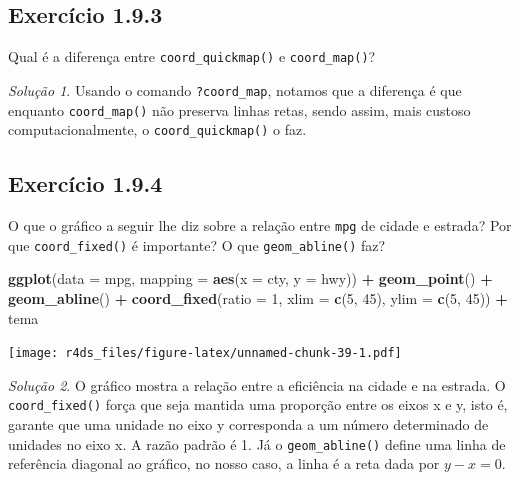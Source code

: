 \documentclass[
]{latex/krantz}
\newenvironment{Shaded}{\begin{snugshade}}{\end{snugshade}}
\newcommand{\AttributeTok}[1]{\textcolor[rgb]{0.13,0.29,0.53}{#1}}
\newcommand{\DecValTok}[1]{\textcolor[rgb]{0.00,0.00,0.81}{#1}}
\newcommand{\FunctionTok}[1]{\textcolor[rgb]{0.13,0.29,0.53}{\textbf{#1}}}
\newcommand{\NormalTok}[1]{#1}
\newcommand{\SpecialCharTok}[1]{\textcolor[rgb]{0.81,0.36,0.00}{\textbf{#1}}}
\theoremstyle{definition}
\theoremstyle{definition}
\theoremstyle{definition}
\theoremstyle{definition}
\theoremstyle{remark}
\newtheorem*{solution}{Solução}
\begin{document}
\hypertarget{exr1-9-3}{%
\subsection*{Exercício 1.9.3}\label{exr1-9-3}}

Qual é a diferença entre \texttt{coord\_quickmap()} e \texttt{coord\_map()}?

\begin{solution}
Usando o comando \texttt{?coord\_map}, notamos que a diferença é que enquanto \texttt{coord\_map()} não preserva linhas retas, sendo assim, mais custoso computacionalmente, o \texttt{coord\_quickmap()} o faz.
\end{solution}

\hypertarget{exr1-9-4}{%
\subsection*{Exercício 1.9.4}\label{exr1-9-4}}

O que o gráfico a seguir lhe diz sobre a relação entre \texttt{mpg} de cidade e estrada? Por que \texttt{coord\_fixed()} é importante? O que \texttt{geom\_abline()} faz?

\begin{Shaded}
\begin{Highlighting}[]
\FunctionTok{ggplot}\NormalTok{(}\AttributeTok{data =}\NormalTok{ mpg, }\AttributeTok{mapping =} \FunctionTok{aes}\NormalTok{(}\AttributeTok{x =}\NormalTok{ cty, }\AttributeTok{y =}\NormalTok{ hwy)) }\SpecialCharTok{+}
    \FunctionTok{geom\_point}\NormalTok{() }\SpecialCharTok{+}
    \FunctionTok{geom\_abline}\NormalTok{() }\SpecialCharTok{+}
    \FunctionTok{coord\_fixed}\NormalTok{(}\AttributeTok{ratio =} \DecValTok{1}\NormalTok{, }\AttributeTok{xlim =} \FunctionTok{c}\NormalTok{(}\DecValTok{5}\NormalTok{, }\DecValTok{45}\NormalTok{), }\AttributeTok{ylim =} \FunctionTok{c}\NormalTok{(}\DecValTok{5}\NormalTok{, }\DecValTok{45}\NormalTok{)) }\SpecialCharTok{+}
\NormalTok{    tema}
\end{Highlighting}
\end{Shaded}

\texttt{[image: r4ds\_files/figure-latex/unnamed-chunk-39-1.pdf]}

\begin{solution}
O gráfico mostra a relação entre a eficiência na cidade e na estrada. O \texttt{coord\_fixed()} força que seja mantida uma proporção entre os eixos x e y, isto é, garante que uma unidade no eixo y corresponda a um número determinado de unidades no eixo x. A razão padrão é 1. Já o \texttt{geom\_abline()} define uma linha de referência diagonal ao gráfico, no nosso caso, a linha é a reta dada por \(y - x = 0\).
\end{solution}
\end{document}
